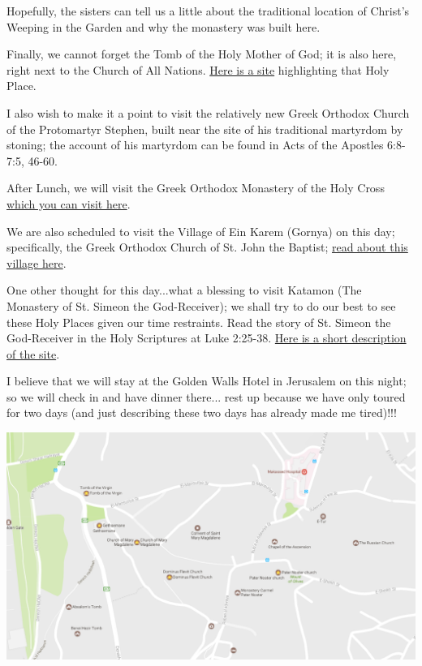 \documentclass[letterpaper]{report}
\begin{document}
Hopefully, the sisters can tell us a little about the traditional location of 
Christ's Weeping in the Garden and why the monastery was built here.

Finally, we cannot forget the Tomb of the Holy Mother of God;
it is also here, right next to the Church of All Nations.
\href{https://orthodoxword.wordpress.com/2010/08/15/the-tomb-of-the-most-holy-virgin-jerusalem/}{
Here is a site} highlighting that Holy Place.

I also wish to make it a point to visit the relatively new Greek Orthodox
Church of the Protomartyr Stephen,
built near the site of his traditional martyrdom by stoning;
the account of his martyrdom can be found in
Acts of the Apostles 6:8-7:5, 46-60.

After Lunch,
we will visit the Greek Orthodox Monastery of the Holy Cross
\href{http://www.biblewalks.com/Sites/CrossMonastery.html}{
	which you can visit here}.

We are also scheduled to visit the Village of Ein Karem (Gornya)
on this day;
specifically, the Greek Orthodox Church of St. John the Baptist;
\href{https://www.holyland-pilgrimage.org/ein-karem-home-of-john-the-baptist-and-place-of-the-visitation}{read about this village here}.

One other thought for this day...what a blessing to visit Katamon
(The Monastery of St. Simeon the God-Receiver);
we shall try to do our best to see these Holy Places given our time
restraints.
Read the story of St. Simeon the God-Receiver in the Holy Scriptures at
Luke 2:25-38.
\href{http://www.goisrael.com/Tourism_Eng/Tourist%20Information/Christian%20Themes/Details/Pages/St.%20Simeon%E2%80%99s%20Monastery%20chr.aspx}
	{Here is a short description of the site}.
	
I believe that we will stay at the Golden Walls Hotel in Jerusalem on this
night; so we will check in and have dinner there...
rest up because we have only toured for two days
(and just describing these two days has already made me tired)!!!

\includegraphics[width=\textwidth]{MountOfOlives}
\end{document}
